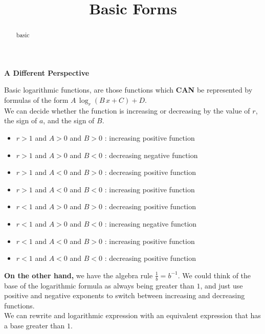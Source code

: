 \documentclass{ximera}
\title{Basic Forms}
\begin{document}
\begin{abstract}
basic
\end{abstract}
\maketitle






\textbf{\textcolor{blue!55!black}{A Different Perspective}} 


Basic logarithmic functions, are those functions which \textbf{\textcolor{red!80!black}{CAN}} be represented by formulas of the form $A \, \log_r(B \, x + C) + D$.  \\


We can decide whether the function is increasing or decreasing by the value of $r$, the sign of $a$, and the sign of $B$. \\





\begin{itemize}
\item $r > 1$ and $A > 0$ and $B > 0$ : increasing positive function
\item $r > 1$ and $A > 0$ and $B < 0$ : decreasing negative function  
\item $r > 1$ and $A < 0$ and $B > 0$ : decreasing positive function
\item $r > 1$ and $A < 0$ and $B < 0$ : increasing positive function
\item $r < 1$ and $A > 0$ and $B > 0$ : decreasing positive function
\item $r < 1$ and $A > 0$ and $B < 0$ : increasing negative function  
\item $r < 1$ and $A < 0$ and $B > 0$ : increasing positive function
\item $r < 1$ and $A < 0$ and $B < 0$ : decreasing positive function
\end{itemize}





\textbf{On the other hand,} we have the algebra rule $\frac{1}{b} = b^{-1}$.  We could think of the base of the logarithmic formula as always being greater than $1$, and just use positive and negative exponents to switch between increasing and decreasing functions. \\

We can rewrite and logarithmic expression with an equivalent expression that has a base greater than $1$. \\
\end{document}
